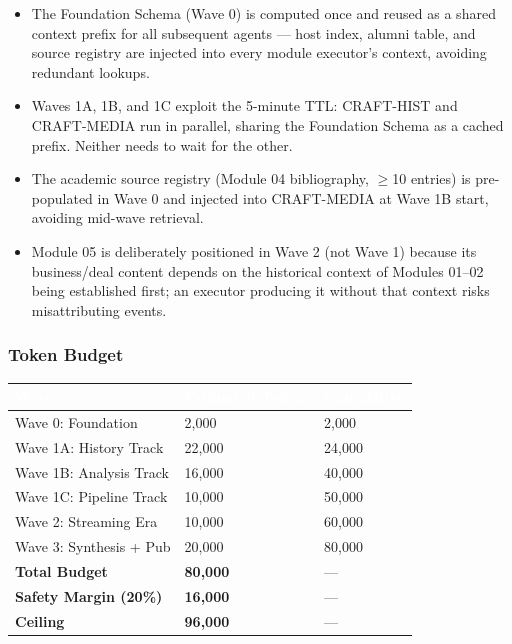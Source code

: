 \documentclass[11pt,letterpaper]{article}
\newcommand{\tableheader}[1]{\textbf{\sffamily\textcolor{white}{#1}}}
\begin{document}
\begin{itemize}[leftmargin=*]
  \item The Foundation Schema (Wave 0) is computed once and reused as a shared context prefix for all subsequent agents --- host index, alumni table, and source registry are injected into every module executor's context, avoiding redundant lookups.
  \item Waves 1A, 1B, and 1C exploit the 5-minute TTL: CRAFT-HIST and CRAFT-MEDIA run in parallel, sharing the Foundation Schema as a cached prefix. Neither needs to wait for the other.
  \item The academic source registry (Module 04 bibliography, $\geq$10 entries) is pre-populated in Wave 0 and injected into CRAFT-MEDIA at Wave 1B start, avoiding mid-wave retrieval.
  \item Module 05 is deliberately positioned in Wave 2 (not Wave 1) because its business/deal content depends on the historical context of Modules 01--02 being established first; an executor producing it without that context risks misattributing events.
\end{itemize}

\subsubsection{Token Budget}

\begin{center}
\begin{tabularx}{\textwidth}{XC{3.5cm}C{3.5cm}}
\toprule
{}
\tableheader{Wave} & \tableheader{Estimated Tokens} & \tableheader{Cumulative} \\
\midrule
Wave 0: Foundation & 2,000 & 2,000 \\
Wave 1A: History Track & 22,000 & 24,000 \\
Wave 1B: Analysis Track & 16,000 & 40,000 \\
Wave 1C: Pipeline Track & 10,000 & 50,000 \\
Wave 2: Streaming Era & 10,000 & 60,000 \\
Wave 3: Synthesis + Pub & 20,000 & 80,000 \\
\midrule
\textbf{Total Budget} & \textbf{80,000} & --- \\
\textbf{Safety Margin (20\%)} & \textbf{16,000} & --- \\
\textbf{Ceiling} & \textbf{96,000} & --- \\
\bottomrule
\end{tabularx}
\end{center}
\end{document}
